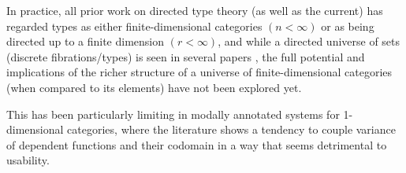 \documentclass{lmcs} %
\theoremstyle{plain}\newtheorem{satz}[thm]{Satz} %
\theoremstyle{plain}
\theoremstyle{definition}
\begin{document}
In practice, all prior work on directed type theory (as well as the current) has regarded types as either finite-dimensional categories $(n < \infty)$ or as being directed up to a finite dimension $(r < \infty)$,
and while a directed universe of sets (discrete fibrations/types) is seen in several papers \cite{2dtt,riehl-shulman-dtt,weaver-licata-dua,dua-simplicial},
the full potential and implications of the richer structure of a universe of finite-dimensional categories (when compared to its elements) have not been explored yet.

This has been particularly limiting in modally annotated systems for 1-dimensional categories, where the literature shows a tendency to couple variance of dependent functions and their codomain in a way that seems detrimental to usability.  
\end{document}
